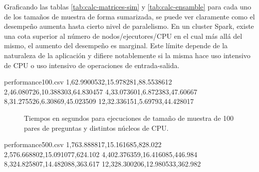 Graficando las tablas \ref{tab:calc-matrices-sim} y \ref{tab:calc-ensamble} para cada uno de los tamaños de muestra de forma sumarizada, se puede ver claramente como el desempeño aumenta hasta cierto nivel de paralelismo. En un cluster Spark, existe una cota superior al número de nodos/ejecutores/CPU en el cual más allá del mismo, el aumento del desempeño es marginal. Este límite depende de la naturaleza de la aplicación y difiere notablemente si la misma hace uso intensivo de CPU o uso intensivo de operaciones de entrada-salida.

\begin{filecontents*}{performance100.csv}
1,62.9900532,15.978281,88.5538612
2,46.080726,10.388303,64.830457
4,33.073601,6.872383,47.60667
8,31.275526,6.30869,45.023509
12,32.336151,5.69793,44.428017
\end{filecontents*}

\begin{figure}
	\centering
	\scriptsize
	\caption{Tiempos en segundos para ejecuciones de tamaño de muestra de 100 pares de preguntas y distintos núcleos de CPU.}
	\label{fig:performance100}
\end{figure}

\begin{filecontents*}{performance500.csv}
1,763.888817,15.161685,828.022
2,576.668802,15.091077,624.102
4,402.376359,16.416085,446.984
8,324.825807,14.482088,363.617
12,328.300206,12.980533,362.982
\end{filecontents*}

